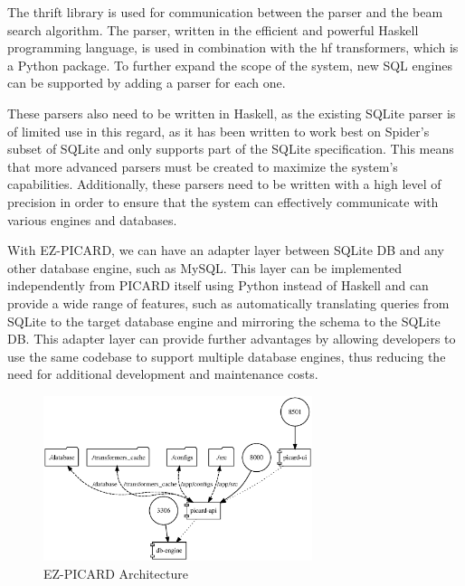 
The thrift library is used for communication between the parser and the beam search algorithm. The parser, written in the efficient and powerful Haskell programming language, is used in combination with the hf transformers, which is a Python package. To further expand the scope of the system, new SQL engines can be supported by adding a parser for each one.

These parsers also need to be written in Haskell, as the existing SQLite parser is of limited use in this regard, as it has been written to work best on Spider's subset of SQLite and only supports part of the SQLite specification. This means that more advanced parsers must be created to maximize the system's capabilities. Additionally, these parsers need to be written with a high level of precision in order to ensure that the system can effectively communicate with various engines and databases.

With EZ-PICARD, we can have an adapter layer between SQLite DB and any other database engine, such as MySQL. This layer can be implemented independently from PICARD itself using Python instead of Haskell and can provide a wide range of features, such as automatically translating queries from SQLite to the target database engine and mirroring the schema to the SQLite DB. This adapter layer can provide further advantages by allowing developers to use the same codebase to support multiple database engines, thus reducing the need for additional development and maintenance costs.

\begin{figure}[h]
    \centering
    \includegraphics[width=0.7\textwidth]{pics/ez/mapeps}
    \caption{\small EZ-PICARD Architecture}
\end{figure}